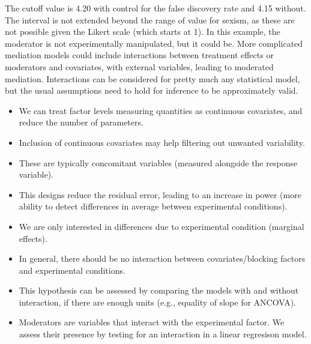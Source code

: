 \documentclass[
  11pt,
  letterpaper,
]{scrbook}
\providecommand{\tightlist}{%
  \setlength{\itemsep}{0pt}\setlength{\parskip}{0pt}}\usepackage{longtable,booktabs,array}
\theoremstyle{definition}
\theoremstyle{definition}
\theoremstyle{remark}
\begin{document}
The cutoff value is 4.20 with control for the false discovery rate and
4.15 without. The interval is not extended beyond the range of value for
sexism, as these are not possible given the Likert scale (which starts
at 1). In this example, the moderator is not experimentally manipulated,
but it could be. More complicated mediation models could include
interactions between treatment effects or moderators and covariates,
with external variables, leading to moderated mediation. Interactions
can be considered for pretty much any statistical model, but the usual
assumptions need to hold for inference to be approximately valid.

\begin{tcolorbox}[enhanced jigsaw, opacityback=0, opacitybacktitle=0.6, leftrule=.75mm, colbacktitle=quarto-callout-important-color!10!white, breakable, toptitle=1mm, bottomrule=.15mm, title=\textcolor{quarto-callout-important-color}{\faExclamation}\hspace{0.5em}{\textbf{Summary}}, coltitle=black, colframe=quarto-callout-important-color-frame, colback=white, left=2mm, toprule=.15mm, arc=.35mm, bottomtitle=1mm, titlerule=0mm, rightrule=.15mm]

\begin{itemize}
\tightlist
\item
  We can treat factor levels measuring quantities as continuous
  covariates, and reduce the number of parameters.
\item
  Inclusion of continuous covariates may help filtering out unwanted
  variability.
\item
  These are typically concomitant variables (measured alongside the
  response variable).
\item
  This designs reduce the residual error, leading to an increase in
  power (more ability to detect differences in average between
  experimental conditions).
\item
  We are only interested in differences due to experimental condition
  (marginal effects).
\item
  In general, there should be no interaction between covariates/blocking
  factors and experimental conditions.
\item
  This hypothesis can be assessed by comparing the models with and
  without interaction, if there are enough units (e.g., equality of
  slope for ANCOVA).
\item
  Moderators are variables that interact with the experimental factor.
  We assess their presence by testing for an interaction in a linear
  regresison model.
\end{itemize}

\end{tcolorbox}
\end{document}
